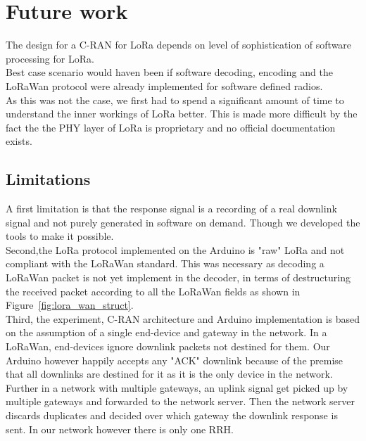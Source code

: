 \chapter{Future work}
The design for a C-RAN for LoRa depends on level of sophistication of
software processing for LoRa. \\
Best case scenario would haven been if software decoding, encoding and the LoRaWan protocol
were already implemented for software defined radios.
\\
As this was not the case, we first had to spend a significant amount of time 
to understand the inner workings of LoRa better. This is made more difficult by the fact 
the the PHY layer of LoRa is proprietary and no official documentation exists.

\section{Limitations}
A first limitation is that the response signal is a recording of a real downlink signal and not 
purely generated in software on demand. Though we developed the tools to make it possible.
\\
Second,the LoRa protocol implemented on the Arduino is "raw" LoRa and not compliant 
with the LoRaWan standard. This was necessary as decoding a LoRaWan packet is not yet implement in 
the decoder, in terms of destructuring the received packet according to all the LoRaWan fields as shown
in Figure~\ref{fig:lora_wan_struct}.
\\
Third, the experiment, C-RAN architecture and Arduino implementation is based on the assumption 
of a single end-device and gateway in the network. In a LoRaWan, end-devices ignore downlink packets
not destined for them. Our Arduino however happily accepts any "ACK" downlink because of the premise that 
all downlinks are destined for it as it is the only device in the network.\\
Further in a network with multiple gateways, an uplink signal get picked up by multiple gateways and 
forwarded to the network server. Then the network server discards duplicates and decided over which gateway
the downlink response is sent. In our network however there is only one RRH.

